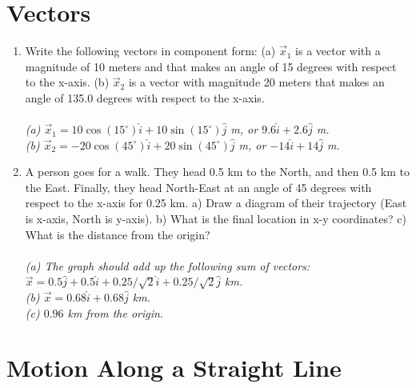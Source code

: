 \documentclass[10pt]{article}
\begin{document}
\section{Vectors}

\begin{enumerate}
\item Write the following vectors in component form: (a) $\vec{x}_1$ is a vector with a magnitude of 10 meters and that makes an angle of 15 degrees with respect to the x-axis. (b) $\vec{x}_2$ is a vector with magnitude 20 meters that makes an angle of 135.0 degrees with respect to the x-axis.  \\ \\
\textit{(a) $\vec{x}_1 = 10\cos(15^{\circ})\hat{i} + 10\sin(15^{\circ})\hat{j}$ m, or $9.6 \hat{i} + 2.6 \hat{j}$ m.} \\
\textit{(b) $\vec{x}_2 = -20\cos(45^{\circ})\hat{i} + 20\sin(45^{\circ})\hat{j}$ m, or $-14 \hat{i} + 14 \hat{j}$ m.}
\item A person goes for a walk.  They head 0.5 km to the North, and then 0.5 km to the East.  Finally, they head North-East at an angle of 45 degrees with respect to the x-axis for 0.25 km.  a) Draw a diagram of their trajectory (East is x-axis, North is y-axis). b) What is the final location in x-y coordinates? c) What is the distance from the origin? \\ \\
\textit{(a) The graph should add up the following sum of vectors: $\vec{x} = 0.5\hat{j} + 0.5\hat{i} + 0.25/\sqrt{2}\hat{i} + 0.25/\sqrt{2} \hat{j}$ km.} \\
\textit{(b) $\vec{x} = 0.68\hat{i} +0.68\hat{j}$ km.} \\
\textit{(c) $0.96$ km from the origin.}
\end{enumerate}

\section{Motion Along a Straight Line}
\end{document}
